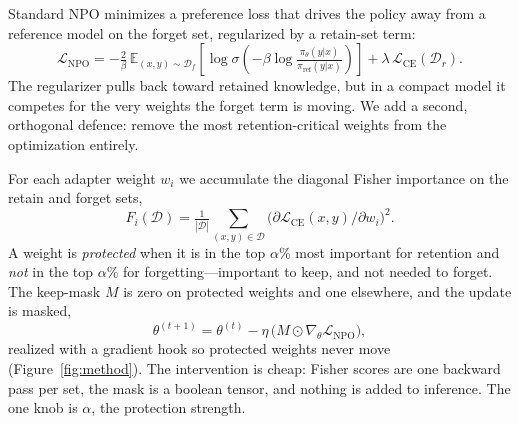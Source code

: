 \documentclass[sigconf,nonacm]{acmart}
\begin{document}
Standard NPO minimizes a preference loss that drives the policy away from a reference model on the forget set, regularized by a retain-set term:
\begin{equation}
\mathcal{L}_{\mathrm{NPO}} = -\tfrac{2}{\beta}\,\mathbb{E}_{(x,y)\sim\mathcal{D}_f}\!\left[\log\sigma\!\left(-\beta\log\tfrac{\pi_\theta(y|x)}{\pi_{\mathrm{ref}}(y|x)}\right)\right] + \lambda\,\mathcal{L}_{\mathrm{CE}}(\mathcal{D}_r).
\end{equation}
The regularizer pulls back toward retained knowledge, but in a compact model it competes for the very weights the forget term is moving. We add a second, orthogonal defence: remove the most retention-critical weights from the optimization entirely.

For each adapter weight $w_i$ we accumulate the diagonal Fisher importance on the retain and forget sets,
\begin{equation}
F_i(\mathcal{D}) = \tfrac{1}{|\mathcal{D}|}\textstyle\sum_{(x,y)\in\mathcal{D}} \big(\partial \mathcal{L}_{\mathrm{CE}}(x,y)/\partial w_i\big)^2 .
\end{equation}
A weight is \emph{protected} when it is in the top $\alpha\%$ most important for retention and \emph{not} in the top $\alpha\%$ for forgetting---important to keep, and not needed to forget. The keep-mask $M$ is zero on protected weights and one elsewhere, and the update is masked,
\begin{equation}
\theta^{(t+1)} = \theta^{(t)} - \eta\,\big(M \odot \nabla_\theta \mathcal{L}_{\mathrm{NPO}}\big),
\end{equation}
realized with a gradient hook so protected weights never move (Figure~\ref{fig:method}). The intervention is cheap: Fisher scores are one backward pass per set, the mask is a boolean tensor, and nothing is added to inference. The one knob is $\alpha$, the protection strength.
\end{document}
